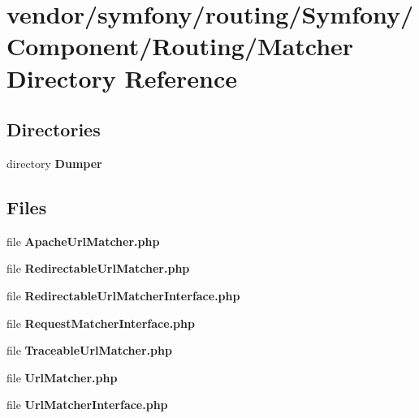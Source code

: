 \section{vendor/symfony/routing/\+Symfony/\+Component/\+Routing/\+Matcher Directory Reference}
\label{dir_1b1dee45ede9ef743701b3e030b4d80b}
\subsection*{Directories}
\begin{DoxyCompactItemize}
\item 
directory {\bf Dumper}
\end{DoxyCompactItemize}
\subsection*{Files}
\begin{DoxyCompactItemize}
\item 
file {\bf Apache\+Url\+Matcher.\+php}
\item 
file {\bf Redirectable\+Url\+Matcher.\+php}
\item 
file {\bf Redirectable\+Url\+Matcher\+Interface.\+php}
\item 
file {\bf Request\+Matcher\+Interface.\+php}
\item 
file {\bf Traceable\+Url\+Matcher.\+php}
\item 
file {\bf Url\+Matcher.\+php}
\item 
file {\bf Url\+Matcher\+Interface.\+php}
\end{DoxyCompactItemize}
